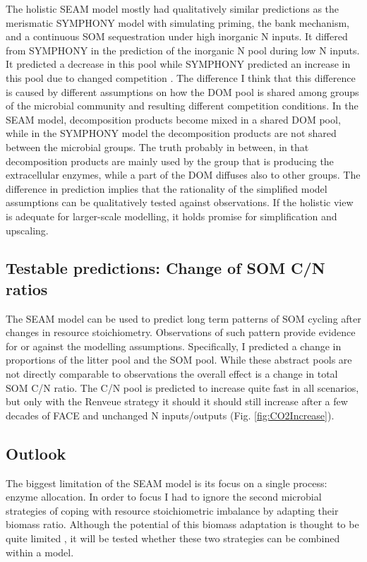 The holistic SEAM model mostly had qualitatively similar predictions as the
merismatic SYMPHONY model with simulating priming, the bank mechanism, and a
continuous SOM sequestration under high inorganic N inputs. It differed from
SYMPHONY in the prediction of the inorganic N pool during low N inputs. It
predicted a decrease in this pool while SYMPHONY predicted an increase in this
pool due to changed competition \citep{Perveen14}. The difference I think that
this difference is caused by different assumptions on how the DOM pool is shared
among groups of the microbial community and resulting different competition
conditions. In the SEAM model, decomposition products become mixed in a shared
DOM pool, while in the SYMPHONY model the decomposition products are not shared
between the microbial groups.
The truth probably in between, in that decomposition products are mainly used by
the group that is producing the extracellular enzymes, while a part of the DOM
diffuses also to other groups.
The difference in prediction implies that the rationality of the simplified
model assumptions can be qualitatively tested against observations. If the
holistic view is adequate for larger-scale modelling, it holds promise for
simplification and upscaling.

\subsection{Testable predictions: Change of SOM C/N ratios}
The SEAM model can be used to predict long term patterns of SOM cycling
after changes in resource stoichiometry. Observations of such pattern 
provide evidence for or against the modelling assumptions.
Specifically, I predicted a change in proportions of the litter pool and the
SOM pool. While these abstract pools are not directly comparable to observations
the overall effect is a change in total SOM C/N ratio. The C/N pool is
predicted to increase quite fast in all scenarios, but only with
the Renveue strategy it should it should still increase after a few decades of
FACE and unchanged N inputs/outputs (Fig. \ref{fig:CO2Increase}).
 
\subsection{Outlook}
The biggest limitation of the SEAM model is its focus on a single process:
enzyme allocation. In order to focus I had to ignore the second microbial
strategies of coping with resource stoichiometric imbalance by adapting their
biomass ratio. Although the potential of this biomass
adaptation is thought to be quite limited \citep{Mooshammer14}, it will be
tested whether these two strategies can be combined within a model.

